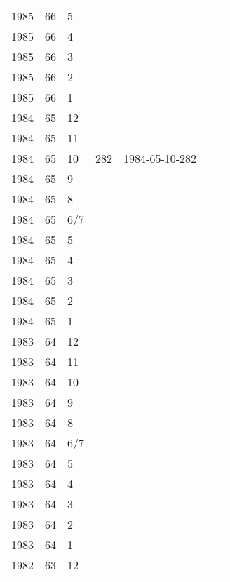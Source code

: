 \begin{longtable}{ |l|l|l|l|p{2.7cm}|l|p{2cm}| }
 1985 & 66 &     5 &         &                &  & \\
 1985 & 66 &     4 &         &                &  & \\
 1985 & 66 &     3 &         &                &  & \\
 1985 & 66 &     2 &         &                &  & \\
 1985 & 66 &     1 &         &                &  & \\
 1984 & 65 &    12 &         &                &  & \\
 1984 & 65 &    11 &         &                &  & \\
 1984 & 65 &    10 &     282 & 1984-65-10-282 &  & \\
 1984 & 65 &     9 &         &                &  & \\
 1984 & 65 &     8 &         &                &  & \\
 1984 & 65 &   6/7 &         &                &  & \\
 1984 & 65 &     5 &         &                &  & \\
 1984 & 65 &     4 &         &                &  & \\
 1984 & 65 &     3 &         &                &  & \\
 1984 & 65 &     2 &         &                &  & \\
 1984 & 65 &     1 &         &                &  & \\
 1983 & 64 &    12 &         &                &  & \\
 1983 & 64 &    11 &         &                &  & \\
 1983 & 64 &    10 &         &                &  & \\
 1983 & 64 &     9 &         &                &  & \\
 1983 & 64 &     8 &         &                &  & \\
 1983 & 64 &   6/7 &         &                &  & \\
 1983 & 64 &     5 &         &                &  & \\
 1983 & 64 &     4 &         &                &  & \\
 1983 & 64 &     3 &         &                &  & \\
 1983 & 64 &     2 &         &                &  & \\
 1983 & 64 &     1 &         &                &  & \\
 1982 & 63 &    12 &         &                &  & \\

\end{longtable}
